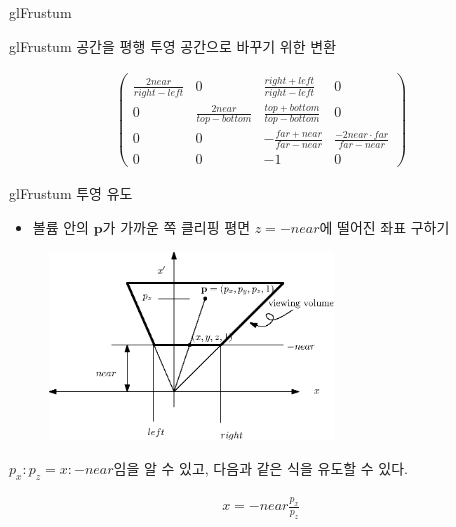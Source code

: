 \documentclass{beamer}
\begin{document}
\begin{frame}[fragile]{glFrustum}

glFrustum 공간을 평행 투영 공간으로 바꾸기 위한 변환

\begin{eqnarray}
\label{eq:OGL_camera:glFrustumMatrix}
\left ( 
\begin{array}{cccc} \nonumber
\frac{2 near}{right-left}& 0 & \frac{right+left}{right - left} & 0\\ \nonumber
0& \frac{2 near}{top-bottom} & \frac{top+bottom}{top - bottom} & 0\\ \nonumber
0& 0 & -\frac{far+near}{far-near} & \frac{-2 near \cdot far}{far-near}\\ \nonumber
0& 0 & -1 & 0 \nonumber
\end{array} 
\right )
\end{eqnarray}

\end{frame}


\begin{frame}[fragile]{glFrustum 투영 유도}

{\small
\begin{itemize}
\item 볼륨 안의 $\mathbf p$가 가까운 쪽 클리핑 평면 $z=-near$에 떨어진 좌표 구하기
\end{itemize}

\begin{figure}[h!]
  \centering
    \includegraphics[height=5cm]{OGL_camera/glFrustumXProjection.eps}
\end{figure}

$p_x:p_z = x:-near$임을 알 수 있고, 다음과 같은 식을 유도할 수 있다.

\begin{eqnarray}
x = - near \frac{p_x}{p_z}
\end{eqnarray}
}

\end{frame}
\end{document}
